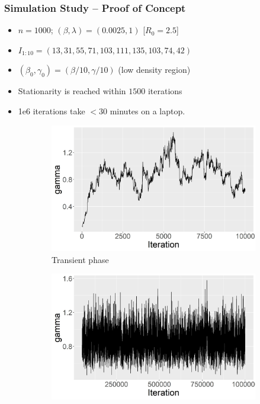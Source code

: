 \documentclass{beamer}
\begin{document}
\begin{frame} \frametitle{Simulation Study -- Proof of Concept}  
	\begin{itemize}
		\item $n = 1000$;  $(\beta, \lambda) = (0.0025, 1)$ [$R_0 = 2.5$]
		\item $I_{1:10} = (13, 31,  55, 71, 103, 111, 135, 103, 74, 42)$
		\item$(\beta_0, \gamma_0) = (\beta/10, \gamma/10)$ (low density region)
		\item Stationarity is reached within $1500$ iterations
		\item 1e6 iterations take $<30$ minutes on a laptop.
	\end{itemize} 
	
	\begin{figure}
		\centering
		\begin{subfigure}[b]{0.32\textwidth}
			\centering
			\includegraphics[width=\textwidth]{E1_short_no_burn_gamma_tp}
			\caption{Transient phase}
			\label{fig:E1_short_no_burn_gamma_tp}
		\end{subfigure}
		\hfill
		\begin{subfigure}[b]{0.32\textwidth}
			\centering
			\includegraphics[width=\textwidth]{E1_burn_gamma_tp}

\end{subfigure}
\end{figure}
\end{frame}
\end{document}
